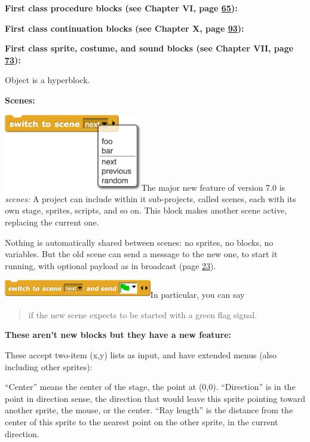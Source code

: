 \textbf{First class procedure blocks (see Chapter VI, page
\hyperref[procedures-as-data]{65}):}

\textbf{First class continuation blocks (see Chapter X, page
\hyperref[continuations]{93}):}

\textbf{First class sprite, costume, and sound blocks (see Chapter VII,
page \hyperref[object-oriented-programming-with-sprites]{73}):}

Object is a hyperblock.

\textbf{Scenes:}

\includegraphics[width=2.38in,height=1.32in]{media/image280.png}The
major new feature of version 7.0 is \emph{scenes:} A project can include
within it sub-projects, called scenes, each with its own stage, sprites,
scripts, and so on. This block makes another scene active, replacing the
current one.

Nothing is automatically shared between scenes: no sprites, no blocks,
no variables. But the old scene can send a message to the new one, to
start it running, with optional payload as in broadcast (page
\hyperref[broadcast]{23}).

\includegraphics[width=2.54in,height=0.31in]{media/image281.png}In
particular, you can say

\begin{quote}
if the new scene expects to be started with a green flag signal.
\end{quote}

\textbf{\hfill\break
These aren't new blocks but they have a new feature:}

These accept two-item (x,y) lists as input, and have extended menus
(also including other sprites):

``Center'' means the center of the stage, the point at (0,0).
``Direction'' is in the point in direction sense, the direction that
would leave this sprite pointing toward another sprite, the mouse, or
the center. ``Ray length'' is the distance from the center of this
sprite to the nearest point on the other sprite, in the current
direction.

